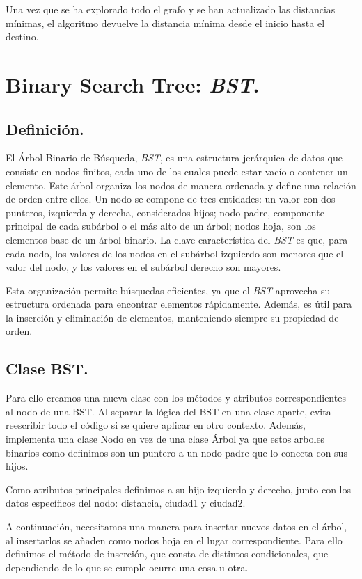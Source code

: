 \documentclass[12pt,oneside]{book}
\begin{document}
Una vez que se ha explorado todo el grafo y se han actualizado las distancias mínimas, el algoritmo devuelve la distancia mínima desde el inicio hasta el destino.






\newpage
\section{Binary Search Tree: \textit{BST}.}
   \subsection{Definición.}
El Árbol Binario de Búsqueda, \textit{BST}, es una estructura jerárquica de datos que consiste en nodos finitos, cada uno de los cuales puede estar vacío o contener un elemento. Este árbol organiza los nodos de manera ordenada y define una relación de orden entre ellos. Un nodo se compone de tres entidades: un valor con dos punteros, izquierda y derecha, considerados hijos; nodo padre, componente principal de cada subárbol o el más alto de un árbol; nodos hoja, son los elementos base de un árbol binario. La clave característica del \textit{BST} es que, para cada nodo, los valores de los nodos en el subárbol izquierdo son menores que el valor del nodo, y los valores en el subárbol derecho son mayores.

Esta organización permite búsquedas eficientes, ya que el \textit{BST} aprovecha su estructura ordenada para encontrar elementos rápidamente. Además, es útil para la inserción y eliminación de elementos, manteniendo siempre su propiedad de orden.
   \subsection{Clase BST.}
Para ello creamos una nueva clase con los métodos y atributos correspondientes al nodo de una BST. Al separar la lógica del BST en una clase aparte, evita reescribir todo el código si se quiere aplicar en otro contexto.  Además, implementa una clase Nodo en vez de una clase Árbol ya que estos arboles binarios como definimos son un puntero a un nodo padre que lo conecta con sus hijos.

Como atributos principales definimos a su hijo izquierdo y derecho, junto con los datos específicos del nodo: distancia, ciudad1 y ciudad2.

A continuación, necesitamos una manera para insertar nuevos datos en el árbol, al insertarlos se añaden como nodos hoja en el lugar correspondiente. Para ello definimos el método de inserción, que consta de distintos condicionales, que dependiendo de lo que se cumple ocurre una cosa u otra. 
\end{document}
